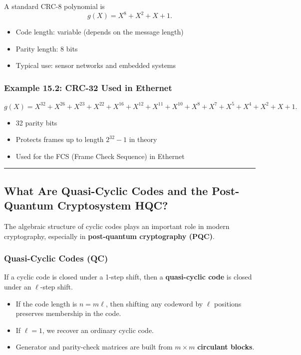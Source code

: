 \documentclass[
]{article}
\providecommand{\tightlist}{%
  \setlength{\itemsep}{0pt}\setlength{\parskip}{0pt}}
\begin{document}
A standard CRC-8 polynomial is \[g(X)=X^8+X^2+X+1.\]

\begin{itemize}
\tightlist
\item
  Code length: variable (depends on the message length)
\item
  Parity length: 8 bits
\item
  Typical use: sensor networks and embedded systems
\end{itemize}

\subsubsection{Example 15.2: CRC-32 Used in
Ethernet}\label{example-15.2-crc-32-used-in-ethernet}

\[g(X)=X^{32} + X^{26} + X^{23} + X^{22} + X^{16} + X^{12} + X^{11} + X^{10} + X^8 + X^7 + X^5 + X^4 + X^2 + X + 1.\]

\begin{itemize}
\tightlist
\item
  32 parity bits
\item
  Protects frames up to length \(2^{32}-1\) in theory
\item
  Used for the FCS (Frame Check Sequence) in Ethernet
\end{itemize}

\begin{center}\rule{0.5\linewidth}{0.5pt}\end{center}

\subsection{What Are Quasi-Cyclic Codes and the Post-Quantum
Cryptosystem
HQC?}\label{what-are-quasi-cyclic-codes-and-the-post-quantum-cryptosystem-hqc}

The algebraic structure of cyclic codes plays an important role in
modern cryptography, especially in \textbf{post-quantum cryptography
(PQC)}.

\subsubsection{Quasi-Cyclic Codes (QC)}\label{quasi-cyclic-codes-qc}

If a cyclic code is closed under a 1-step shift, then a
\textbf{quasi-cyclic code} is closed under an \(\ell\)-step shift.

\begin{itemize}
\tightlist
\item
  If the code length is \(n=m\ell\), then shifting any codeword by
  \(\ell\) positions preserves membership in the code.
\item
  If \(\ell=1\), we recover an ordinary cyclic code.
\item
  Generator and parity-check matrices are built from \(m \times m\)
  \textbf{circulant blocks}.
\end{itemize}
\end{document}
